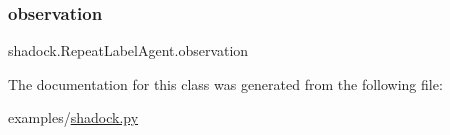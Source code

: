 \mbox{\label{classshadock_1_1RepeatLabelAgent_a2455b332a14c998490f888f28322a3bd}} 
\subsubsection{\texorpdfstring{observation}{observation}}
{\footnotesize\ttfamily shadock.\+Repeat\+Label\+Agent.\+observation}



The documentation for this class was generated from the following file\+:\begin{DoxyCompactItemize}
\item 
examples/\hyperlink{shadock_8py}{shadock.\+py}\end{DoxyCompactItemize}
